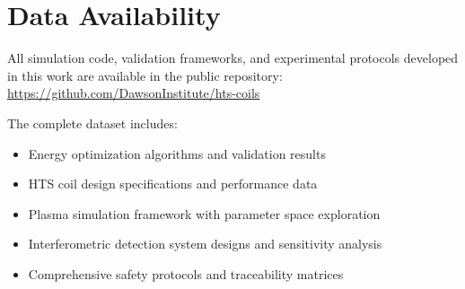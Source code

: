 \documentclass[12pt,a4paper]{article}
\begin{document}
\section*{Data Availability}

All simulation code, validation frameworks, and experimental protocols developed in this work are available in the public repository: \url{https://github.com/DawsonInstitute/hts-coils}

The complete dataset includes:
\begin{itemize}
\item Energy optimization algorithms and validation results
\item HTS coil design specifications and performance data
\item Plasma simulation framework with parameter space exploration
\item Interferometric detection system designs and sensitivity analysis
\item Comprehensive safety protocols and traceability matrices
\end{itemize}
\end{document}
